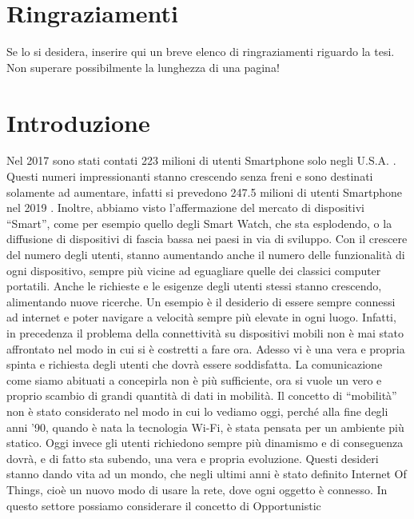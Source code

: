 \chapter*{Ringraziamenti}

Se lo si desidera, inserire qui un breve elenco di ringraziamenti riguardo la tesi.\\

Non superare possibilmente la lunghezza di una pagina!


\chapter*{Introduzione}


Nel 2017 sono stati contati  223 milioni di utenti Smartphone solo negli U.S.A.
\cite{statista:1}. Questi numeri impressionanti stanno crescendo senza freni e sono destinati
solamente ad aumentare, infatti si prevedono
247.5 milioni di utenti Smartphone nel 2019 \cite{statista:1}.
Inoltre, abbiamo visto l'affermazione del mercato di dispositivi “Smart”, come per esempio
quello degli Smart Watch, che sta esplodendo, o la
diffusione di dispositivi di fascia bassa nei paesi in via di sviluppo.
Con il crescere del numero degli utenti, stanno aumentando anche il numero delle
funzionalità di ogni dispositivo, sempre più vicine ad eguagliare quelle dei classici
computer portatili. Anche le richieste e le esigenze degli utenti stessi stanno crescendo,
alimentando nuove ricerche. Un esempio è il desiderio di essere sempre connessi
ad internet e poter navigare a velocità sempre più elevate in ogni luogo. Infatti, in
precedenza il problema della connettività su dispositivi mobili non è mai stato affrontato
nel modo in cui si è costretti a fare ora. Adesso vi è una vera e propria spinta
e richiesta degli utenti che dovrà essere soddisfatta. La comunicazione come siamo
abituati a concepirla non è più sufficiente, ora si vuole un vero e proprio scambio di
grandi quantità di dati in mobilità. Il concetto di “mobilità” non è stato considerato
nel modo in cui lo vediamo oggi, perché alla fine degli anni ’90, quando è nata la
tecnologia Wi-Fi, è stata pensata per un ambiente più statico. Oggi invece gli utenti
richiedono sempre più dinamismo e di conseguenza dovrà, e di fatto sta subendo,
una vera e propria evoluzione.
Questi desideri stanno dando vita ad un mondo, che negli ultimi anni è stato
definito Internet Of Things, cioè un nuovo modo di usare la rete, dove ogni oggetto
è connesso. In questo settore possiamo considerare il concetto di Opportunistic
